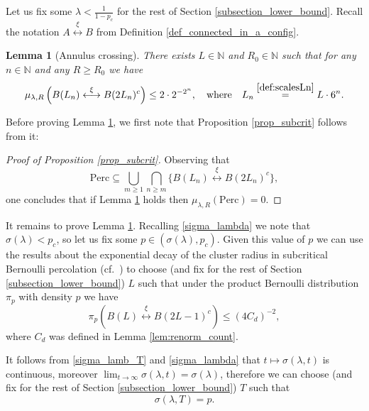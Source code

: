 \documentclass[a4paper,12pt]{article}
\newtheorem  {lemma}         [theorem]{Lemma}
\begin{document}
Let us fix some $\lambda < \frac{1}{1-p_c}$  for the rest of Section \ref{subsection_lower_bound}. Recall the notation  $A \stackrel{\xi}{\longleftrightarrow} B$
from Definition \ref{def_connected_in_a_config}.

\begin{lemma}[Annulus crossing]\label{lemma_subcrit_1}
There exists $L \in \mathbb{N}$ and $R_0 \in \mathbb{N}$ such that for any $n \in \mathbb{N}$ and any $R \geq R_0$ we have
\begin{equation}
 \mu_{\lambda,R}\left( B(L_{n}) \stackrel{ \xi }{\longleftrightarrow}  B(2L_n)^c  \right) \leq 2 \cdot  2^{-2^n}, \quad \text{where} \quad L_n  \stackrel{ \eqref{def:scalesLn} }{=}L \cdot 6^n.
\end{equation}
\end{lemma}
 Before proving Lemma \ref{lemma_subcrit_1}, we first note that Proposition \ref{prop_subcrit} follows from it:
\begin{proof}[Proof of Proposition \ref{prop_subcrit}] Observing that
\begin{equation}
\mathrm{Perc} \subseteq \bigcup_{m \geq 1}\bigcap_{n \geq m} \{ B(L_{n}) \stackrel{ \xi }{\longleftrightarrow}  B(2L_n)^c  \},
\end{equation}
one concludes that if Lemma \ref{lemma_subcrit_1}  holds then $\mu_{\lambda,R}(\mathrm{Perc}) = 0$.
\end{proof}
 It remains to prove Lemma \ref{lemma_subcrit_1}.
Recalling \eqref{sigma_lambda} we note that $\sigma(\lambda)<p_c$, so let us fix some $p\in (\sigma(\lambda), p_c)$.
Given this value of $p$ we can use the results about the exponential decay of the cluster radius in subcritical Bernoulli percolation (cf.\
\cite[Section 5.2]{Gr99}) to
 choose (and fix for the rest of Section \ref{subsection_lower_bound}) $L$ such that under the product Bernoulli distribution $\pi_p$ with density $p$ we have
\begin{equation}\label{subcrit_benoulli_perc_crossing}
  \pi_p \left( B( L ) \stackrel{ \xi }{\longleftrightarrow}  B(2L-1)^c \right) \leq (4 C_d)^{-2},
\end{equation}
where $C_d$ was defined in Lemma \ref{lem:renorm_count}.

\smallskip

It follows from \eqref{sigma_lamb_T} and \eqref{sigma_lambda} that $t \mapsto \sigma(\lambda,t)$ is continuous, moreover $\lim_{t \to \infty} \sigma(\lambda,t)=\sigma(\lambda)$, therefore we can choose (and fix for the rest of Section \ref{subsection_lower_bound}) $T$ such that
\begin{equation}\label{sigma_p}
\sigma(\lambda,T)=p.
\end{equation}
\end{document}
